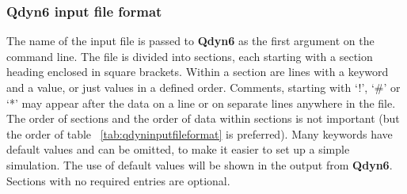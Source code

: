 \documentclass[a4paper,11pt]{article}
\let\origref\ref
\def\ref#1{\unskip~\origref{#1}}
\begin{document}
\subsubsection{\textbf{Qdyn6} input file format}\label{subsubsec:qdyn_inp_file_form}
The name of the input file is passed to \textbf{Qdyn6} as the first argument
on the command line. The file is divided into sections, each
starting with a section heading enclosed in square brackets.
Within a section are lines with a keyword and a value, or just
values in a defined order. Comments, starting with `!', `\#' or
`*' may appear after the data on a line or on separate lines
anywhere in the file. The order of sections and the order of data
within sections is not important (but the order of table
\ref{tab:qdyninputfileformat} is preferred). Many keywords have
default values and can be omitted, to make it easier to set up a
simple simulation. The use of default values will be shown in the
output from \textbf{Qdyn6}. Sections with no required entries are optional.
\small
\end{document}
